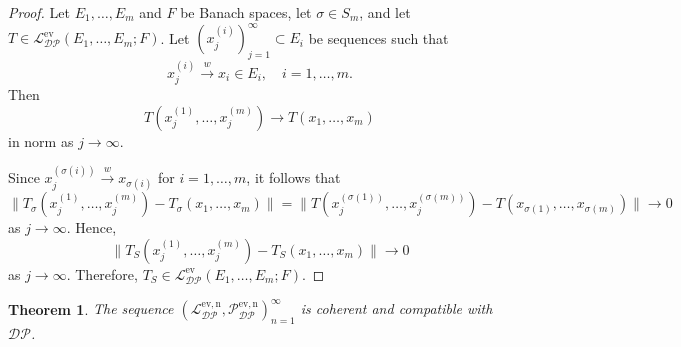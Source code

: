 \documentclass[12 pt]{article}%
\newtheorem{theorem}{Theorem}[section]
\newtheorem{final remark}[theorem]{Final Remark}
\begin{document}
\begin{proof}
	Let $E_1,\dots,E_m$ and $F$ be Banach spaces, let $\sigma \in S_m$, and let $T \in \mathcal{L_{DP}^{\mathrm{ev}}}(E_1,\dots,E_m;F)$. Let $(x_j^{(i)})_{j=1}^{\infty} \subset E_i$ be sequences such that
	\begin{equation*}
		x_j^{(i)} \overset{w}{\longrightarrow} x_i \in E_i, \quad i=1,\dots,m.
	\end{equation*}
	Then
	\begin{equation*}
		T(x_j^{(1)},\dots,x_j^{(m)}) \longrightarrow T(x_1,\dots,x_m)
	\end{equation*}
	in norm as $j \to \infty$.
	
	Since $x_j^{(\sigma(i))} \overset{w}{\to} x_{\sigma(i)}$ for $i=1,\dots,m$, it follows that
	\begin{equation*}
		\|T_{\sigma}(x_j^{(1)},\dots,x_j^{(m)}) - T_{\sigma}(x_1,\dots,x_m)\|
		= \|T(x_j^{(\sigma(1))},\dots,x_j^{(\sigma(m))}) - T(x_{\sigma(1)},\dots,x_{\sigma(m)})\| \to 0
	\end{equation*}
	as $j \to \infty$. Hence,
	\begin{equation*}
		\|T_S(x_j^{(1)},\dots,x_j^{(m)}) - T_S(x_1,\dots,x_m)\| \to 0
	\end{equation*}
	as $j \to \infty$. Therefore, $T_S \in \mathcal{L_{DP}^{\mathrm{ev}}}(E_1,\dots,E_m;F)$.
\end{proof}

\begin{theorem}\label{DPcoercomp}
 The sequence $\left(\mathcal{L_{DP}^{\mathrm{ev,n}}}, \mathcal{P_{DP}^{\mathrm{ev,n}}} \right)_{n=1}^{\infty}$ is coherent and compatible with $\mathcal{DP}$.
\end{theorem}
\end{document}
